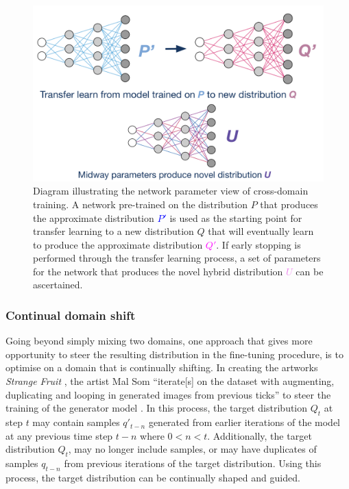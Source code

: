 \begin{figure}[!htbp]
    \centering
    \includegraphics[width=1\textwidth]{figures/c6_active_div/diagrams/cross_domain_training.png}
    \caption[Diagram illustrating the network parameter view of cross-domain training.]{Diagram illustrating the network parameter view of cross-domain training. A network pre-trained on the distribution $P$ that produces the approximate distribution \textcolor{blue}{$P'$} is used as the starting point for transfer learning to a new distribution $Q$ that will eventually learn to produce the approximate distribution \textcolor{magenta}{$Q'$}. If early stopping is performed through the transfer learning process, a set of parameters for the network that produces the novel hybrid distribution \textcolor{violet}{$U$} can be ascertained.}
  \label{fig:c6:cross-domain-training}
  \end{figure}

\subsubsection{Continual domain shift}
\label{section:domainshift}

Going beyond simply mixing two domains, one approach that gives more opportunity to steer the resulting distribution in the fine-tuning procedure, is to optimise on a domain that is continually shifting. In creating the artworks \textit{Strange Fruit} \citep{som2020strange}, the artist Mal Som ``iterate[s] on the dataset with augmenting, duplicating and looping in generated images from previous ticks'' to steer the training of the generator model \citep{som2021personal}. 
In this process, the target distribution $Q_t$ at step $t$ may contain samples $q'_{t-n}$ generated from earlier iterations of the model at any previous time step $t-n$ where $0<n<t$. 
Additionally, the target distribution $Q_t$, may no longer include samples, or may have duplicates of samples $q_{t-n}$ from previous iterations of the target distribution. 
Using this process, the target distribution can be continually shaped and guided. 


